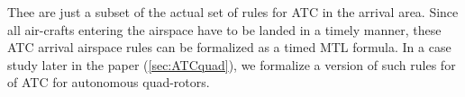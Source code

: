 Thee are just a subset of the actual set of rules for ATC in the arrival area. Since all air-crafts entering the airspace have to be landed in a timely manner, these ATC arrival airspace rules can be formalized as a timed MTL formula. In a case study later in the paper (\ref{sec:ATCquad}), we formalize a version of such rules for of ATC for autonomous quad-rotors.

